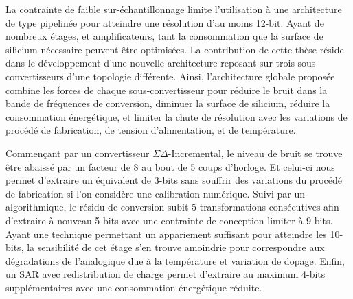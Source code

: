 \begin{mdframed}[linecolor=Prune,linewidth=1]
La contrainte de faible sur-échantillonnage limite l'utilisation à une architecture de type pipelinée pour atteindre une résolution d'au moins 12-bit. Ayant de nombreux étages, et amplificateurs, tant la consommation que la surface de silicium nécessaire peuvent être optimisées. La contribution de cette thèse réside dans le développement d'une nouvelle architecture reposant sur trois sous-convertisseurs d'une topologie différente. Ainsi, l'architecture globale proposée combine les forces de chaque sous-convertisseur pour réduire le bruit dans la bande de fréquences de conversion, diminuer la surface de silicium, réduire la consommation énergétique, et limiter la chute de résolution avec les variations de procédé de fabrication, de tension d'alimentation, et de température.

Commençant par un convertisseur $\Sigma\Delta$-Incremental, le niveau de bruit se trouve être abaissé par un facteur de 8 au bout de 5 coups d'horloge. Et celui-ci nous permet d'extraire un équivalent de 3-bits sans souffrir des variations du procédé de fabrication si l'on considère une calibration numérique. Suivi par un algorithmique, le résidu de conversion subit 5 transformations consécutives afin d'extraire à nouveau 5-bits avec une contrainte de conception limiter à 9-bits. Ayant une technique permettant un appariement suffisant pour atteindre les 10-bits, la sensibilité de cet étage s'en trouve amoindrie pour correspondre aux dégradations de l'analogique due à la température et variation de dopage. Enfin, un SAR avec redistribution de charge permet d'extraire au maximum 4-bits supplémentaires avec une consommation énergétique réduite.


\end{mdframed}
